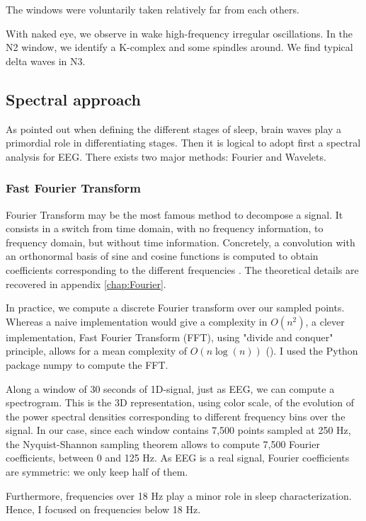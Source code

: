 \documentclass[12pt]{report}
\begin{document}
The windows were voluntarily taken relatively far from each others.

With naked eye, we observe in wake high-frequency irregular oscillations. In the N2 window, we identify a K-complex and some spindles around. We find typical delta waves in N3.

\subsection{Spectral approach}

As pointed out when defining the different stages of sleep, brain waves play a primordial role in differentiating stages. Then it is logical to adopt first a spectral analysis for EEG. There exists two major methods: Fourier and Wavelets.

\subsubsection{Fast Fourier Transform} \label{subsubsection:Fourier}

Fourier Transform may be the most famous method to decompose a signal. It consists in a switch from time domain, with no frequency information, to frequency domain, but without time information. Concretely, a convolution with an orthonormal basis of sine and cosine functions is computed to obtain coefficients corresponding to the different frequencies . The theoretical details are recovered in appendix \ref{chap:Fourier}.

In practice, we compute a discrete Fourier transform over our sampled points. Whereas a naive implementation would give a complexity in $O(n^2)$, a clever implementation, Fast Fourier Transform (FFT), using "divide and conquer" principle, allows for a mean complexity of $O(n\log(n))$ (\cite{walker1996fast}). I used the Python package numpy to compute the FFT.

Along a window of 30 seconds of 1D-signal, just as EEG, we can compute a spectrogram. This is the 3D representation, using color scale, of the evolution of the power spectral densities corresponding to different frequency bins over the signal. In our case, since each window contains 7,500 points sampled at 250 Hz, the Nyquist-Shannon sampling theorem allows to compute 7,500 Fourier coefficients, between 0 and 125 Hz. As EEG is a real signal, Fourier coefficients are symmetric: we only keep half of them.

Furthermore, frequencies over 18 Hz play a minor role in sleep characterization. Hence, I focused on frequencies below 18 Hz.
\end{document}

